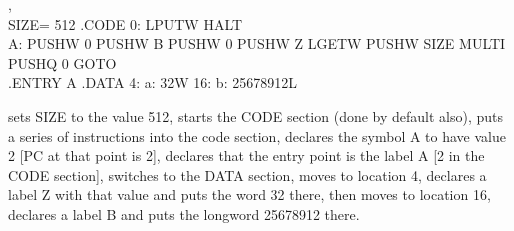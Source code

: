 \documentclass {report}
\begin{document}
\zB,\\
SIZE= 512 .CODE 0: LPUTW HALT\\ 
A: PUSHW 0 PUSHW B PUSHW 0 PUSHW Z LGETW PUSHW SIZE MULTI \\
PUSHQ 0 GOTO\\
.ENTRY A .DATA 4: a: 32W 16: b: 25678912L

sets SIZE to the value 512, starts the CODE section (done by default also),
puts a series of instructions into the code section, declares the symbol A 
to have value 2 [PC at that point is 2], declares that the entry point is 
the label A [2 in the CODE section], switches to the DATA section, moves to 
location 4, declares a label Z with that value and puts the word 32 there, 
then moves to location 16, declares a label B and 
puts the longword 25678912 there.
\end{document}
